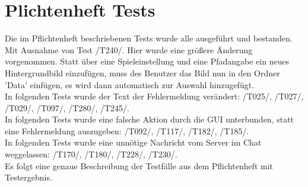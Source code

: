 \documentclass[a4paper]{article}
\begin{document}
	
\section{Plichtenheft Tests}
Die im Pflichtenheft beschriebenen Tests wurde alle ausgeführt und bestanden. Mit Ausnahme von Test /T240/. Hier wurde eine größere Änderung vorgenommen. Statt über eine Spieleinstellung und eine Pfadangabe ein neues Hintergrundbild einzufügen, muss des Benutzer das Bild nun in den Ordner 'Data' einfügen, es wird dann automatisch zur Auswahl hinzugefügt.\\
In folgenden Tests wurde der Text der Fehlermeldung verändert: /T025/, /T027/, /T029/, /T097/, /T280/, /T245/.  \\
In folgenden Tests wurde eine falsche Aktion durch die GUI unterbunden, statt eine Fehlermeldung auszugeben: /T092/, /T117/, /T182/, /T185/.  \\
In folgenden Tests wurde eine unnötige Nachricht vom Server im Chat weggelassen: /T170/, /T180/, /T228/, /T230/.\\
Es folgt eine genaue Beschreibung der Testfälle aus dem Pflichtenheft mit Testergebnis.
\end{document}
